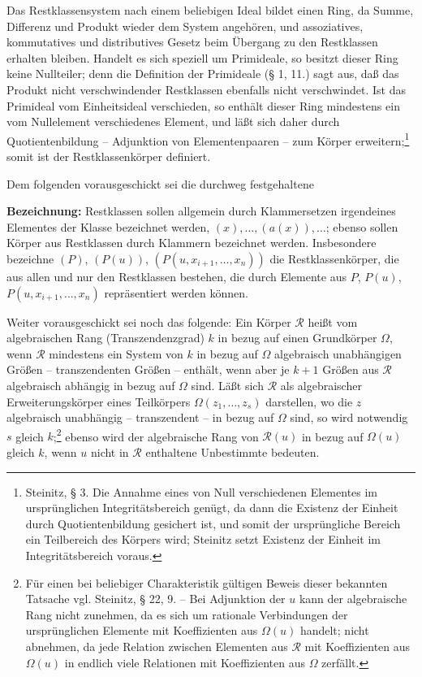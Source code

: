 \documentclass[11pt]{article}
\begin{document}
Das Restklassensystem nach einem beliebigen Ideal bildet einen Ring, da Summe, Differenz und Produkt wieder dem System angehören, und assoziatives, kommutatives und distributives Gesetz beim Übergang zu den Restklassen erhalten bleiben. Handelt es sich speziell um Primideale, so besitzt dieser Ring keine Nullteiler; denn die Definition der Primideale (§ 1, 11.) sagt aus, daß das Produkt nicht verschwindender Restklassen ebenfalls nicht verschwindet. Ist das Primideal vom Einheitsideal verschieden, so enthält dieser Ring mindestens ein vom Nullelement verschiedenes Element, und läßt sich daher durch Quotientenbildung -- Adjunktion von Elementenpaaren -- zum Körper erweitern;\footnote{Steinitz, § 3. Die Annahme eines von Null verschiedenen Elementes im ursprünglichen Integritätsbereich genügt, da dann die Existenz der Einheit durch Quotientenbildung gesichert ist, und somit der ursprüngliche Bereich ein Teilbereich des Körpers wird; Steinitz setzt Existenz der Einheit im Integritätsbereich voraus.} somit ist der Restklassenkörper definiert.

Dem folgenden vorausgeschickt sei die durchweg festgehaltene

\textbf{Bezeichnung:} Restklassen sollen allgemein durch Klammersetzen irgendeines Elementes der Klasse bezeichnet werden, $(x),\ldots,(a(x)),\ldots$; ebenso sollen Körper aus Restklassen durch Klammern bezeichnet werden. Insbesondere bezeichne $(P)$, $(P(u))$, $(P(u,x_{i+1},\ldots,x_n))$ die Restklassenkörper, die aus allen und nur den Restklassen bestehen, die durch Elemente aus $P$, $P(u)$, $P(u,x_{i+1},\ldots,x_n)$ repräsentiert werden können.

Weiter vorausgeschickt sei noch das folgende: Ein Körper $\mathcal R$ heißt vom algebraischen Rang (Transzendenzgrad) $k$ in bezug auf einen Grundkörper $\Omega$, wenn $\mathcal R$ mindestens ein System von $k$ in bezug auf $\Omega$ algebraisch unabhängigen Größen -- transzendenten Größen -- enthält, wenn aber je $k+1$ Größen aus $\mathcal R$ algebraisch abhängig in bezug auf $\Omega$ sind. Läßt sich $\mathcal R$ als algebraischer Erweiterungskörper eines Teilkörpers $\Omega(z_1,\ldots,z_s)$ darstellen, wo die $z$ algebraisch unabhängig -- transzendent -- in bezug auf $\Omega$ sind, so wird notwendig $s$ gleich $k$;\footnote{Für einen bei beliebiger Charakteristik gültigen Beweis dieser bekannten Tatsache vgl. Steinitz, § 22, 9. -- Bei Adjunktion der $u$ kann der algebraische Rang nicht zunehmen, da es sich um rationale Verbindungen der ursprünglichen Elemente mit Koeffizienten aus $\Omega(u)$ handelt; nicht abnehmen, da jede Relation zwischen Elementen aus $\mathcal R$ mit Koeffizienten aus $\Omega(u)$ in endlich viele Relationen mit Koeffizienten aus $\Omega$ zerfällt.} ebenso wird der algebraische Rang von $\mathcal R(u)$ in bezug auf $\Omega(u)$ gleich $k$, wenn $u$ nicht in $\mathcal R$ enthaltene Unbestimmte bedeuten.
\end{document}
